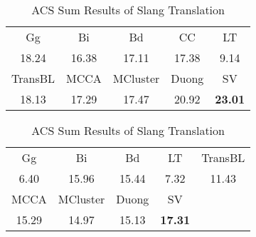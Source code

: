\begin{table}[t] 
	\small
	\centering
	\begin{subtable}[h]{\columnwidth}
		\centering
		\begin{tabular}{|ccccc|}
			\hline
			Gg&  Bi& Bd & CC & LT   \\ 
			18.24 &  16.38&  17.11 & 17.38 & 9.14 \\ \hline   
			TransBL& MCCA & MCluster & Duong   & SV \\ 
			18.13 &  17.29 & 17.47&  20.92& \textbf{23.01}\\ \hline  
		\end{tabular}
	\end{subtable}
	
	\begin{subtable}[h]{\columnwidth}
		\centering
		\begin{tabular}{|ccccc|}
			\hline
			Gg&  Bi& Bd &  LT   & TransBL\\ 
			6.40  &   15.96 &  15.44  & 7.32 & 11.43\\ \hline   
			MCCA & MCluster & Duong   & SV & \\ 
			15.29 & 14.97&  15.13& \textbf{17.31} & \\ \hline  
		\end{tabular}
	\end{subtable} 
	\caption{ACS Sum Results of Slang Translation}
	\label{tab:bleis_acs}
\end{table}

